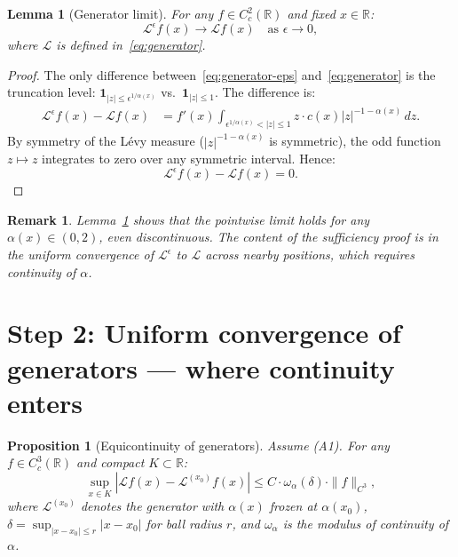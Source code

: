\documentclass{amsart}
\newtheorem{lemma}[theorem]{Lemma}
\newtheorem{proposition}[theorem]{Proposition}
\newtheorem{remark}[theorem]{Remark}
\theoremstyle{definition}
\begin{document}
\begin{lemma}[Generator limit]
\label{lem:gen-limit}
For any $f \in C^2_c(\mathbb{R})$ and fixed $x \in \mathbb{R}$:
\begin{equation}
    \mathcal{L}^\epsilon f(x) \to \mathcal{L} f(x) \quad \text{as } \epsilon \to 0,
\end{equation}
where $\mathcal{L}$ is defined in~\eqref{eq:generator}.
\end{lemma}

\begin{proof}
The only difference between~\eqref{eq:generator-eps} and~\eqref{eq:generator} is
the truncation level: $\mathbf{1}_{|z| \leq \epsilon^{1/\alpha(x)}}$
vs.\ $\mathbf{1}_{|z| \leq 1}$.
The difference is:
\begin{align*}
    \mathcal{L}^\epsilon f(x) - \mathcal{L} f(x)
    &= f'(x) \int_{\epsilon^{1/\alpha(x)} < |z| \leq 1} z \cdot c(x)|z|^{-1-\alpha(x)}\,dz.
\end{align*}
By symmetry of the L\'evy measure ($|z|^{-1-\alpha(x)}$ is symmetric), the
odd function $z \mapsto z$ integrates to zero over any symmetric interval.
Hence:
\[
    \mathcal{L}^\epsilon f(x) - \mathcal{L} f(x) = 0.
\]
\end{proof}

\begin{remark}
Lemma~\ref{lem:gen-limit} shows that the pointwise limit holds for \emph{any}
$\alpha(x) \in (0,2)$, even discontinuous. The content of the sufficiency proof
is in the \emph{uniform} convergence of $\mathcal{L}^\epsilon$ to $\mathcal{L}$
across nearby positions, which requires continuity of $\alpha$.
\end{remark}

\section{Step 2: Uniform convergence of generators --- where continuity enters}

\begin{proposition}[Equicontinuity of generators]
\label{prop:equicontinuous}
Assume (A1). For any $f \in C^3_c(\mathbb{R})$ and compact $K \subset \mathbb{R}$:
\begin{equation}
    \sup_{x \in K}\left|\mathcal{L} f(x) - \mathcal{L}^{(x_0)} f(x)\right|
    \leq C \cdot \omega_\alpha(\delta) \cdot \|f\|_{C^3},
\end{equation}
where $\mathcal{L}^{(x_0)}$ denotes the generator with $\alpha(x)$ frozen at
$\alpha(x_0)$, $\delta = \sup_{|x-x_0| \leq r} |x - x_0|$ for ball radius $r$,
and $\omega_\alpha$ is the modulus of continuity of $\alpha$.
\end{proposition}
\end{document}
